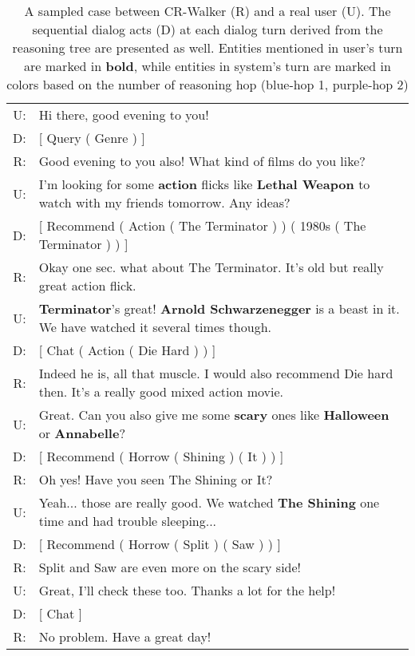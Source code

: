 \documentclass[11pt]{article}
\begin{document}
\begin{table}[tb]
    \small
    \begin{tabular}{rp{6.7cm}}
    \toprule
    U: &Hi there, good evening to you!\\
    D: &[ Query ( \textcolor{layer1}{Genre} ) ] \\
    R: &Good evening to you also! What \textcolor{layer1}{kind of films} do you like?\\
    U: &I'm looking for some \textbf{action} flicks like \textbf{Lethal Weapon} to watch with my friends tomorrow. Any ideas?\\
    D: &[ Recommend ( \textcolor{layer1}{Action} ( \textcolor{layer2}{The Terminator} ) ) ( \textcolor{layer1}{1980s} ( \textcolor{layer2}{The Terminator}  ) ) ] \\
    R: &Okay one sec. what about \textcolor{layer2}{The Terminator}. It's \textcolor{layer1}{old} but really great \textcolor{layer1}{action} flick.\\
    U: &\textbf{Terminator}'s great! \textbf{Arnold Schwarzenegger} is a beast in it. We have watched it several times though.\\
    D: &[ Chat ( \textcolor{layer1}{Action} ( \textcolor{layer2}{Die Hard} ) ) ] \\
    R: &Indeed he is, all that muscle. I would also recommend \textcolor{layer2}{Die hard} then. It's a really good mixed \textcolor{layer1}{action} movie.\\
    U: &Great. Can you also give me some \textbf{scary} ones like \textbf{Halloween} or \textbf{Annabelle}?\\
    D: &[ Recommend ( \textcolor{layer1}{Horrow} ( \textcolor{layer2}{Shining} ) ( \textcolor{layer2}{It} ) ) ]\\
    R: &Oh yes! Have you seen \textcolor{layer2}{The Shining} or \textcolor{layer2}{It}?\\
    U: &Yeah... those are really good. We watched \textbf{The Shining} one time and had trouble sleeping...\\
    D: &[ Recommend ( \textcolor{layer1}{Horrow} ( \textcolor{layer2}{Split} ) ( \textcolor{layer2}{Saw} ) ) ] \\
    R: &\textcolor{layer2}{Split} and \textcolor{layer2}{Saw} are even more on the \textcolor{layer1}{scary} side!\\
    U: &Great, I'll check these too. Thanks a lot for the help!\\
    D: &[ Chat ]\\
    R: &No problem. Have a great day!\\
    \bottomrule
    \end{tabular}
    \caption{A sampled case between CR-Walker (R) and a real user (U). The sequential dialog acts (D) at each dialog turn derived from the reasoning tree are presented as well. Entities mentioned in user's turn are marked in \textbf{bold}, while entities in system's turn are marked in colors based on the number of reasoning hop (\textcolor{layer1}{blue}-hop 1, \textcolor{layer2}{purple}-hop 2)}
    \label{tab:case}
\end{table}
\end{document}

